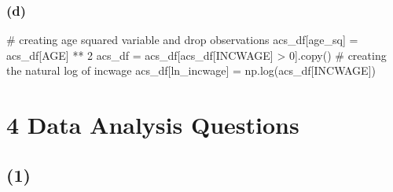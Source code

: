 \documentclass[
  letterpaper,
  DIV=11,
  numbers=noendperiod]{scrartcl}
\newenvironment{Shaded}{\begin{snugshade}}{\end{snugshade}}
\newcommand{\CommentTok}[1]{\textcolor[rgb]{0.37,0.37,0.37}{#1}}
\newcommand{\DecValTok}[1]{\textcolor[rgb]{0.68,0.00,0.00}{#1}}
\newcommand{\NormalTok}[1]{\textcolor[rgb]{0.00,0.23,0.31}{#1}}
\newcommand{\OperatorTok}[1]{\textcolor[rgb]{0.37,0.37,0.37}{#1}}
\newcommand{\StringTok}[1]{\textcolor[rgb]{0.13,0.47,0.30}{#1}}
\begin{document}
\subsubsection{(d)}\label{d}

\begin{Shaded}
\begin{Highlighting}[]
\CommentTok{\# creating age squared variable and drop observations}
\NormalTok{acs\_df[}\StringTok{\textquotesingle{}age\_sq\textquotesingle{}}\NormalTok{] }\OperatorTok{=}\NormalTok{ acs\_df[}\StringTok{\textquotesingle{}AGE\textquotesingle{}}\NormalTok{] }\OperatorTok{**} \DecValTok{2}
\NormalTok{acs\_df }\OperatorTok{=}\NormalTok{ acs\_df[acs\_df[}\StringTok{\textquotesingle{}INCWAGE\textquotesingle{}}\NormalTok{] }\OperatorTok{\textgreater{}} \DecValTok{0}\NormalTok{].copy()}
\CommentTok{\# creating the natural log of incwage}
\NormalTok{acs\_df[}\StringTok{\textquotesingle{}ln\_incwage\textquotesingle{}}\NormalTok{] }\OperatorTok{=}\NormalTok{ np.log(acs\_df[}\StringTok{\textquotesingle{}INCWAGE\textquotesingle{}}\NormalTok{])}
\end{Highlighting}
\end{Shaded}

\section{4 Data Analysis Questions}\label{data-analysis-questions}

\subsection{(1)}\label{section-1}
\end{document}
